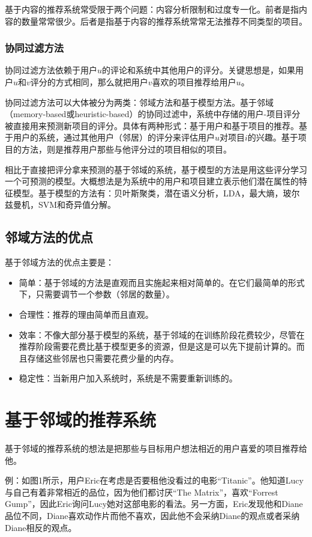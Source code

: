 \documentclass{article}
\begin{document}
 基于内容的推荐系统常受限于两个问题：内容分析限制和过度专一化。前者是指内容的数量常常很少。后者是指基于内容的推荐系统常常无法推荐不同类型的项目。

 \subsubsection{协同过滤方法}
 协同过滤方法依赖于用户$u$的评论和系统中其他用户的评分。关键思想是，如果用户$u$和$v$评分的方式相同，那么就把用户$v$喜欢的项目推荐给用户$u$。

 协同过滤方法可以大体被分为两类：邻域方法和基于模型方法。基于邻域（memory-based或heuristic-based）的协同过滤中，系统中存储的用户-项目评分被直接用来预测新项目的评分。具体有两种形式：基于用户和基于项目的推荐。基于用户的系统，通过其他用户（邻居）的评分来评估用户$u$对项目$i$的兴趣。基于项目的方法，则是推荐用户那些与他评分过的项目相似的项目。

 相比于直接把评分拿来预测的基于邻域的系统，基于模型的方法是用这些评分学习一个可预测的模型。大概想法是为系统中的用户和项目建立表示他们潜在属性的特征模型。基于模型的方法有：贝叶斯聚类，潜在语义分析，LDA，最大熵，玻尔兹曼机，SVM和奇异值分解。

 \subsection{邻域方法的优点}
 基于邻域方法的优点主要是：
 \begin{itemize}
 \item 简单：基于邻域的方法是直观而且实施起来相对简单的。在它们最简单的形式下，只需要调节一个参数（邻居的数量）。
 \item 合理性：推荐的理由简单而且直观。
 \item 效率：不像大部分基于模型的系统，基于邻域的在训练阶段花费较少，尽管在推荐阶段需要花费比基于模型更多的资源，但是这是可以先下提前计算的。而且存储这些邻居也只需要花费少量的内存。
 \item 稳定性：当新用户加入系统时，系统是不需要重新训练的。
 \end{itemize}
 
 \section{基于邻域的推荐系统}
 基于邻域的推荐系统的想法是把那些与目标用户想法相近的用户喜爱的项目推荐给他。

 例：如图1所示，用户Eric在考虑是否要租他没看过的电影“Titanic”。他知道Lucy与自己有着非常相近的品位，因为他们都讨厌“The Matrix”，喜欢“Forrest Gump”，因此Eric询问Lucy她对这部电影的看法。另一方面，Eric发现他和Diane品位不同，Diane喜欢动作片而他不喜欢，因此他不会采纳Diane的观点或者采纳Diane相反的观点。
\end{document}
